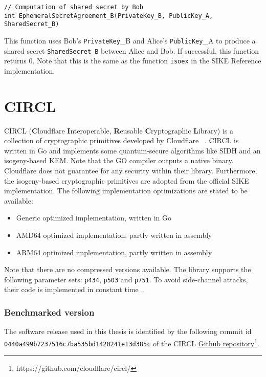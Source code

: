 \begin{lstlisting}[]
// Computation of shared secret by Bob
int EphemeralSecretAgreement_B(PrivateKey_B, PublicKey_A, SharedSecret_B)
\end{lstlisting}
This function uses Bob's \textcolor{keywordcol}{\texttt{PrivateKey}\_B} and Alice's \textcolor{keywordcol}{\texttt{PublicKey}\_A} to produce a shared secret \textcolor{keywordcol}{\texttt{SharedSecret\_B}} between Alice and Bob. If successful, this function returns 0. 
Note that this is the same as the function \texttt{isoex} in the SIKE Reference implementation.


\section{\gls{CIRCL}}

\gls{CIRCL} (\textbf{C}loudflare \textbf{I}nteroperable, \textbf{R}eusable \textbf{C}ryptographic \textbf{L}ibrary) is a collection of cryptographic primitives developed by Cloudflare ~\parencite{circl2020github}. \gls{CIRCL} is written in Go and implements some quantum-secure algorithms like \gls{SIDH} and an isogeny-based \gls{KEM}. Note that the GO compiler outputs a native binary.  Cloudflare does not guarantee for any security within their library. Furthermore, the isogeny-based cryptographic primitives are adopted from the official \gls{SIKE} implementation. The following implementation optimizations are stated to be available:

\begin{itemize}
  \item Generic optimized implementation, written in Go 
  \item AMD64 optimized implementation, partly written in assembly
  \item ARM64 optimized implementation, partly written in assembly
\end{itemize}
Note that there are no compressed versions available. The library supports the following parameter sets: \texttt{p434}, \texttt{p503} and \texttt{p751}. To avoid side-channel attacks, their code is implemented in constant time~\parencite{circl2019intro}.

\subsubsection{Benchmarked version}
The software release used in this thesis is identified by the following commit id \\ \texttt{0440a499b7237516c7ba535bd1420241e13d385c} of the \gls{CIRCL} \href{https://github.com/cloudflare/circl/}{Github repository}\footnote{https://github.com/cloudflare/circl/}.

